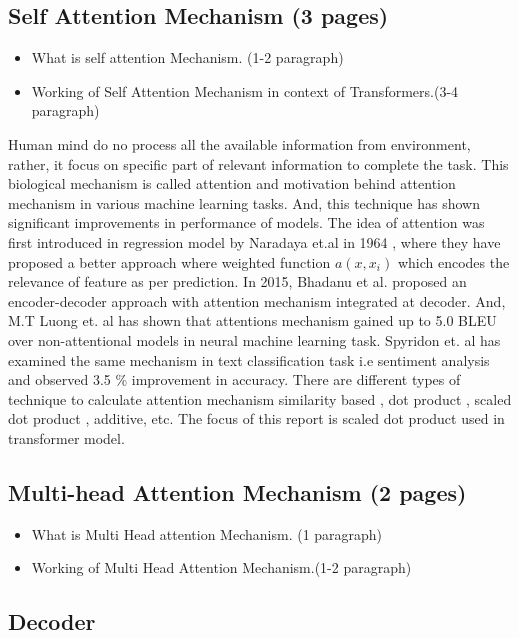 \documentclass[%
	BCOR=8mm, %
	DIV=12, 
	toc=bibliography, %
	toc=listof, %
	oneside, %
	egregdoesnotlikesansseriftitles, %
	]{scrbook}
\begin{document}
\subsection{Self Attention Mechanism (3 pages)}
\begin{itemize}
\item What is self attention Mechanism. (1-2 paragraph)
\item Working of Self Attention Mechanism in context of Transformers.(3-4 paragraph)
\end{itemize}
Human mind do no process all the available information from environment, rather, it focus on specific part of relevant information to complete the task. This biological mechanism is called attention and motivation behind attention mechanism in various machine learning tasks. And, this technique has shown significant improvements in performance of models. 
The idea of attention was first introduced in regression model by Naradaya et.al in 1964 \cite{nadaraya_estimating_1964}, where they have proposed a better approach where weighted function $a(x,x_{i})$ which encodes the relevance of feature as per prediction. In 2015, Bhadanu et al. \cite{bahdanau_neural_2014} proposed an encoder-decoder approach with attention mechanism integrated at decoder. And, M.T Luong et. al \cite{luong_effective_2015} has shown that attentions mechanism gained up to 5.0 BLEU over non-attentional models in neural machine learning task. Spyridon et. al \cite{kardakis_examining_2021} has examined the same mechanism in text classification task i.e sentiment analysis and observed 3.5 \% improvement in accuracy. There are different types of technique to calculate attention mechanism similarity based \cite{graves_neural_2014} , dot product \cite{luong_effective_2015}, scaled dot product \cite{vaswani_attention_2017}, additive\cite{bahdanau_neural_2014}, etc. The focus of this report is scaled dot product used in transformer model.


\subsection{Multi-head Attention Mechanism (2 pages)}
\begin{itemize}
\item What is Multi Head attention Mechanism. (1 paragraph)
\item Working of Multi Head Attention Mechanism.(1-2 paragraph)
\end{itemize}


\subsection{Decoder}
\end{document}
